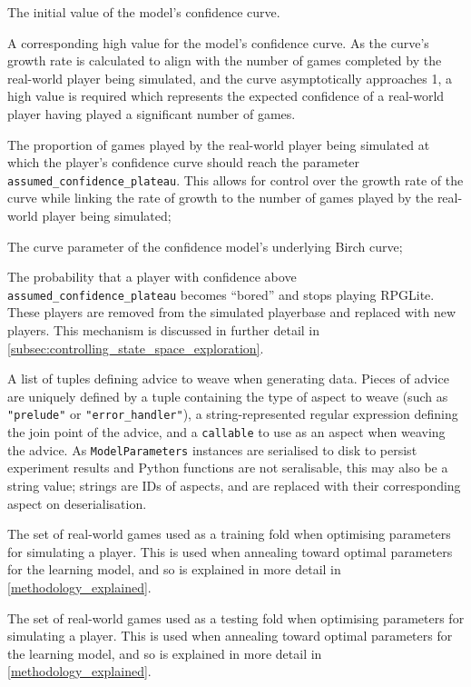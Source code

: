 \begin{description}[style=multiline,leftmargin=4cm]
  \item[starting confidence] The initial value of the model's confidence curve.
  \item[assumed confidence plateau] A corresponding high value for the model's
  confidence curve. As the curve's growth rate is calculated to align with the
  number of games completed by the real-world player being simulated, and the
  curve asymptotically approaches 1, a high value is required which represents
  the expected confidence of a real-world player having played a significant
  number of games.
  \item[curve inflection relative to numgames] The proportion of games played by
  the real-world player being simulated at which the player's confidence
  curve should reach the parameter \\\lstinline{assumed_confidence_plateau}. This
  allows for control over the growth rate of the curve while linking the rate of
  growth to the number of games played by the real-world player being simulated;
  \item[C] The curve parameter of the confidence model's underlying Birch curve;
  \item[prob bored] The probability that a player with confidence above
  \lstinline{assumed_confidence_plateau} becomes ``bored'' and stops playing
  RPGLite. These players are removed from the simulated playerbase and replaced
  with new players. This mechanism is discussed in further detail in
  \cref{subsec:controlling_state_space_exploration}.
  \item[advice] A list of tuples defining advice to weave when generating data.
  Pieces of advice are uniquely defined by a tuple containing the type of aspect
  to weave (such as \lstinline{"prelude"} or \lstinline{"error_handler"}), a
  string-represented regular expression defining the join point of the advice,
  and a \lstinline{callable} to use as an aspect when weaving the advice. As
  \lstinline{ModelParameters} instances are serialised to disk to persist
  experiment results and Python functions are not seralisable, this may also be
  a string value; strings are IDs of aspects, and are replaced with their
  corresponding aspect on deserialisation.
  \item[training data] The set of real-world games used as a training fold when
  optimising parameters for simulating a player. This is used when annealing
  toward optimal parameters for the learning model, and so is explained in more
  detail in \cref{methodology_explained}.
  \item[testing data] The set of real-world games used as a testing fold when
  optimising parameters for simulating a player. This is used when annealing
  toward optimal parameters for the learning model, and so is explained in more
  detail in \cref{methodology_explained}.
\end{description}



